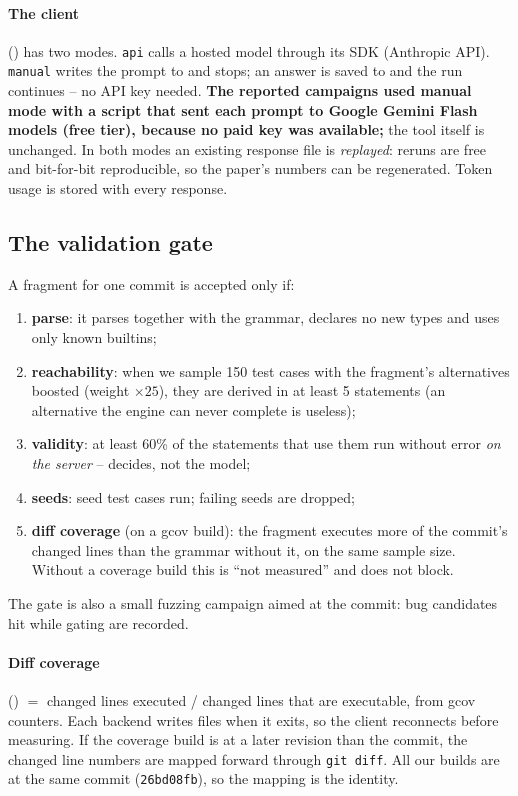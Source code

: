 \paragraph{The client} () has two modes. \texttt{api} calls
a hosted model through its SDK (Anthropic API). \texttt{manual} writes the prompt to
 and stops; an answer is saved to
 and the run continues -- no API key needed.
\textbf{The reported campaigns used manual mode with a script that sent each
prompt to Google Gemini Flash models (free tier), because no paid key was
available;} the tool itself is unchanged. In both modes an existing response file is \emph{replayed}: reruns are
free and bit-for-bit reproducible, so the paper's numbers can be regenerated.
Token usage is stored with every response.

\subsection{The validation gate}
\label{sec:gate}

A fragment for one commit is accepted only if:
\begin{enumerate}
  \item \textbf{parse}: it parses together with the grammar, declares no new
    types and uses only known builtins;
  \item \textbf{reachability}: when we sample 150 test cases with the
    fragment's alternatives boosted (weight $\times 25$), they are derived in at
    least 5 statements (an alternative the engine can never complete is
    useless);
  \item \textbf{validity}: at least 60\% of the statements that use them run
    without error \emph{on the server} -- \pg decides, not the model;
  \item \textbf{seeds}: seed test cases run; failing seeds are dropped;
  \item \textbf{diff coverage} (on a gcov build): the fragment executes more of
    the commit's changed lines than the grammar without it, on the same sample
    size. Without a coverage build this is ``not measured'' and does not block.
\end{enumerate}
The gate is also a small fuzzing campaign aimed at the commit: bug candidates
hit while gating are recorded.

\paragraph{Diff coverage} () $=$ changed lines executed /
changed lines that are executable, from gcov counters. Each backend writes
 files when it exits, so the client reconnects before measuring.
If the coverage build is at a later revision than the commit, the changed line
numbers are mapped forward through \texttt{git diff}. All our builds are at the
same commit (\texttt{26bd08fb}), so the mapping is the identity.

